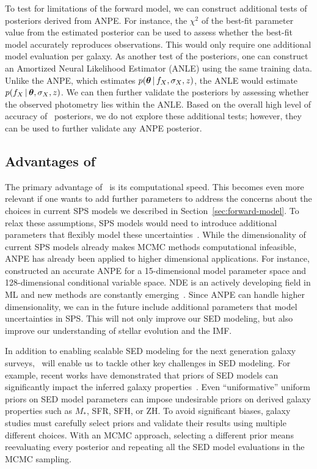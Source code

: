 To test for limitations of the forward model, we can construct additional tests
of posteriors derived from ANPE. 
For instance, the $\chi^2$ of the best-fit parameter value from the 
estimated posterior can be used to assess whether the best-fit model 
accurately reproduces observations.
This would only require one additional model evaluation per galaxy. 
As another test of the posteriors, one can construct an Amortized Neural
Likelihood Estimator (ANLE) using the same training data.
Unlike the ANPE, which estimates $p(\boldsymbol{\theta}\,|\, f_X, \sigma_X, z)$, the ANLE
would estimate $p(f_X \,|\, \boldsymbol{\theta}, \sigma_X, z)$.
We can then further validate the posteriors by assessing whether the observed
photometry lies within the ANLE. 
Based on the overall high level of accuracy of \sedflow~posteriors, we do not
explore these additional tests; however, they can be used to further validate
any ANPE posterior. 

\subsection{Advantages of \sedflow} 
The primary advantage of \sedflow~is its computational speed. 
This becomes even more relevant if one wants to add further parameters to
address the concerns about the choices in current SPS models we described 
in Section~\ref{sec:forward-model}.
To relax these assumptions, SPS models would need to introduce additional
parameters that flexibly model these uncertainties~\citep{conroy2009,
conroy2010c}. 
While the dimensionality of current SPS models already makes MCMC methods
computational infeasible, ANPE has already been applied to higher dimensional
applications.
For instance, \cite{dax2021} constructed an accurate ANPE for a
15-dimensional model parameter space and 128-dimensional conditional variable
space.
NDE is an actively developing field in ML and new methods are constantly
emerging~\citep[\eg][]{wu2020, dhariwal2021}. 
Since ANPE can handle higher dimensionality, we can in the future include additional
parameters that model uncertainties in SPS. 
This will not only improve our SED modeling, but also improve our understanding
of stellar evolution and the IMF.

In addition to enabling scalable SED modeling for the next generation galaxy
surveys, \sedflow~will enable us to tackle other key challenges in SED
modeling. 
For example, recent works have demonstrated that priors of SED models can
significantly impact the inferred galaxy properties~\citep{carnall2018,
leja2019, hahn2022}. 
Even ``uniformative'' uniform priors on SED model parameters can impose
undesirable priors on derived galaxy properties such as $M_*$, SFR, SFH, or
ZH.
To avoid significant biases, galaxy studies must carefully select priors and
validate their results using multiple different choices. 
With an MCMC approach, selecting a different prior means reevaluating every
posterior and repeating all the SED model evaluations in the MCMC sampling.  

